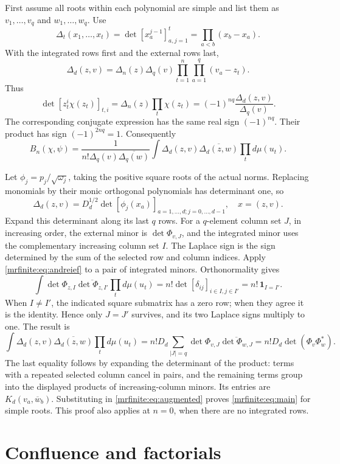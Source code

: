 \documentclass[11pt]{article}
\begin{document}
First assume all roots within each polynomial are simple and list them
as \(v_1,\ldots,v_q\) and \(w_1,\ldots,w_q\). Use
\[
 \Delta_t(x_1,\ldots,x_t)=\det[x_a^{j-1}]_{a,j=1}^t
 =\prod_{a<b}(x_b-x_a).
\]
With the integrated rows first and the external rows last,
\[
 \Delta_d(z,v)=\Delta_n(z)\Delta_q(v)
                    \prod_{t=1}^n\prod_{a=1}^q(v_a-z_t).
\]
Thus
\[
 \det[z_t^i\chi(z_t)]_{t,i}
 =\Delta_n(z)\prod_t\chi(z_t)
 =(-1)^{nq}\frac{\Delta_d(z,v)}{\Delta_q(v)}.
\]
The corresponding conjugate expression has the same real sign
\((-1)^{nq}\). Their product has sign \((-1)^{2nq}=1\). Consequently
\begin{equation}\label{mrfinite:eq:augmented}
 B_n(\chi,\psi)=\frac{1}{n!\Delta_q(v)\overline{\Delta_q(w)}}
  \int\Delta_d(z,v)\overline{\Delta_d(z,w)}\prod_t d\mu(u_t).
\end{equation}

Let \(\phi_j=p_j/\sqrt{\omega_j}\), taking the positive square roots of
the actual norms. Replacing monomials by their monic orthogonal
polynomials has determinant one, so
\[
 \Delta_d(z,v)=D_d^{1/2}\det[\phi_j(x_a)]_{a=1,\ldots,d; j=0,\ldots,d-1},
 \quad x=(z,v).
\]
Expand this determinant along its last \(q\) rows. For a \(q\)-element
column set \(J\), in increasing order, the external minor is
\(\det\Phi_{v,J}\), and the integrated minor uses the complementary
increasing column set \(I\). The Laplace sign is the sign determined by
the sum of the selected row and column indices. Apply
\eqref{mrfinite:eq:andreief} to a pair of integrated minors. Orthonormality gives
\[
 \int\det\Phi_{z,I}\overline{\det\Phi_{z,I'}}\prod_t d\mu(u_t)
   =n!\det[\delta_{ij}]_{i\in I,j\in I'}
   =n!\,\mathbf1_{I=I'}.
\]
When \(I\ne I'\), the indicated square submatrix has a zero row;
when they agree it is the identity. Hence only \(J=J'\) survives, and
its two Laplace signs multiply to one. The result is
\[
 \int\Delta_d(z,v)\overline{\Delta_d(z,w)}\prod_t d\mu(u_t)
  =n!D_d\sum_{|J|=q}\det\Phi_{v,J}\overline{\det\Phi_{w,J}}
  =n!D_d\det(\Phi_v\Phi_w^*).
\]
The last equality follows by expanding the determinant of the product:
terms with a repeated selected column cancel in pairs, and the remaining
terms group into the displayed products of increasing-column minors.
Its entries are \(K_d(v_a,\overline w_b)\). Substituting in
\eqref{mrfinite:eq:augmented} proves \eqref{mrfinite:eq:main} for simple roots. This proof
also applies at \(n=0\), when there are no integrated rows.

\section{Confluence and factorials}\label{mrfinite:sec:confluence}
\end{document}
